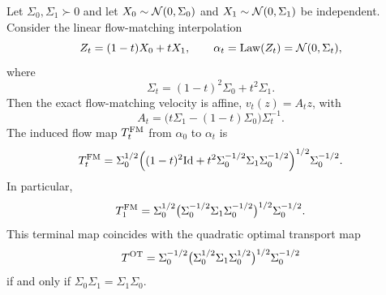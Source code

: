 \begin{prop}\label{prop-gaussian-flow-matching-optimality}
	Let $\Sigma_0,\Sigma_1\succ0$ and let $X_0\sim\mathcal{N}(0,\Sigma_0)$ and $X_1\sim\mathcal{N}(0,\Sigma_1)$ be independent. Consider the linear flow-matching interpolation
	\[
		Z_t=(1-t)X_0+tX_1,
		\qquad
		\alpha_t=\operatorname{Law}(Z_t)=\mathcal{N}(0,\Sigma_t),
	\]
	where
	\begin{equation}\label{eq-gaussian-product-fm-covariance}
		\Sigma_t=(1-t)^2\Sigma_0+t^2\Sigma_1.
	\end{equation}
	Then the exact flow-matching velocity is affine, $v_t(z)=A_tz$, with
	\begin{equation}\label{eq-gaussian-product-fm-velocity}
		A_t=\bigl(t\Sigma_1-(1-t)\Sigma_0\bigr)\Sigma_t^{-1}.
	\end{equation}
	The induced flow map $T_t^{\rm FM}$ from $\alpha_0$ to $\alpha_t$ is
	\begin{equation}\label{eq-gaussian-product-fm-map}
		T_t^{\rm FM}
		=
		\Sigma_0^{1/2}
		\Bigl((1-t)^2\mathrm{Id}+t^2\Sigma_0^{-1/2}\Sigma_1\Sigma_0^{-1/2}\Bigr)^{1/2}
		\Sigma_0^{-1/2}.
	\end{equation}
	In particular,
	\begin{equation}\label{eq-gaussian-product-fm-terminal-map}
		T_1^{\rm FM}
		=
		\Sigma_0^{1/2}
		\bigl(\Sigma_0^{-1/2}\Sigma_1\Sigma_0^{-1/2}\bigr)^{1/2}
		\Sigma_0^{-1/2}.
	\end{equation}
	This terminal map coincides with the quadratic optimal transport map
	\begin{equation}\label{eq-gaussian-brenier-map-comparison}
		T^{\rm OT}
		=
		\Sigma_0^{-1/2}
		\bigl(\Sigma_0^{1/2}\Sigma_1\Sigma_0^{1/2}\bigr)^{1/2}
		\Sigma_0^{-1/2}
	\end{equation}
	if and only if $\Sigma_0\Sigma_1=\Sigma_1\Sigma_0$.
\end{prop}

